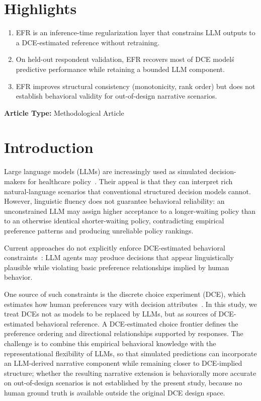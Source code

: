 \documentclass[12pt]{article}
\begin{document}
\clearpage

\section*{Highlights}
\begin{enumerate}
    \item EFR is an inference-time regularization layer that constrains LLM outputs to a DCE-estimated reference without retraining.
    \item On held-out respondent validation, EFR recovers most of DCE model\'s predictive performance while retaining a bounded LLM component.
    \item EFR improves structural consistency (monotonicity, rank order) but does not establish behavioral validity for out-of-design narrative scenarios.
\end{enumerate}

\vspace{1em}
\noindent\textbf{Article Type:} Methodological Article

\clearpage
\section{Introduction}
\label{sec:intro}

Large language models (LLMs) are increasingly used as simulated decision-makers for healthcare policy~\citep{Park2023a, Mu2024, VonHoene2025}. Their appeal is that they can interpret rich natural-language scenarios that conventional structured decision models cannot. However, linguistic fluency does not guarantee behavioral reliability: an unconstrained LLM may assign higher acceptance to a longer-waiting policy than to an otherwise identical shorter-waiting policy, contradicting empirical preference patterns and producing unreliable policy rankings.

Current approaches do not explicitly enforce DCE-estimated behavioral constraints~\citep{Aher2022TuringExperiments, Horton2023, santurkar2023whose}: LLM agents may produce decisions that appear linguistically plausible while violating basic preference relationships implied by human behavior.

One source of such constraints is the discrete choice experiment (DCE), which estimates how human preferences vary with decision attributes~\citep{Chan2024}. In this study, we treat DCEs not as models to be replaced by LLMs, but as sources of DCE-estimated behavioral reference. A DCE-estimated choice frontier defines the preference ordering and directional relationships supported by responses. The challenge is to combine this empirical behavioral knowledge with the representational flexibility of LLMs, so that simulated predictions can incorporate an LLM-derived narrative component while remaining closer to DCE-implied structure; whether the resulting narrative extension is behaviorally more accurate on out-of-design scenarios is not established by the present study, because no human ground truth is available outside the original DCE design space.
\end{document}
